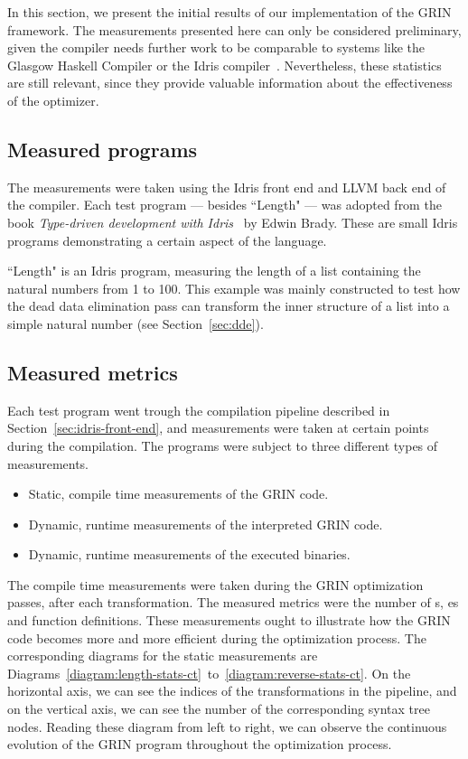 \documentclass[main.tex]{subfiles}
\begin{document}
	
	In this section, we present the initial results of our implementation of the GRIN framework. The measurements presented here can only be considered preliminary, given the compiler needs further work to be comparable to systems like the Glasgow Haskell Compiler or the Idris compiler~\cite{idris}. Nevertheless, these statistics are still relevant, since they provide valuable information about the effectiveness of the optimizer.
	
	\subsection{Measured programs}
	
	The measurements were taken using the Idris front end and LLVM back end of the compiler. Each test program --- besides ``Length" --- was adopted from the book \textit{Type-driven development with Idris}~\cite{tdd-idris} by Edwin Brady. These are small Idris programs demonstrating a certain aspect of the language.
	
	``Length" is an Idris program, measuring the length of a list containing the natural numbers from 1 to 100. This example was mainly constructed to test how the dead data elimination pass can transform the inner structure of a list into a simple natural number (see Section~\ref{sec:dde}).
	
	\subsection{Measured metrics}
	
	Each test program went trough the compilation pipeline described in Section~\ref{sec:idris-front-end}, and measurements were taken at certain points during the compilation. The programs were subject to three different types of measurements.
	
	\vspace{0.25cm}
	\begin{itemize}
		\item Static, compile time measurements of the GRIN code.
		\item Dynamic, runtime measurements of the interpreted GRIN code.
		\item Dynamic, runtime measurements of the executed binaries.
	\end{itemize}
	\vspace{0.25cm}

	The compile time measurements were taken during the GRIN optimization passes, after each transformation. The measured metrics were the number of s, es and function definitions. These measurements ought to illustrate how the GRIN code becomes more and more efficient during the optimization process. The corresponding diagrams for the static measurements are Diagrams~\ref{diagram:length-stats-ct}~to~\ref{diagram:reverse-stats-ct}. On the horizontal axis, we can see the indices of the transformations in the pipeline, and on the vertical axis, we can see the number of the corresponding syntax tree nodes. Reading these diagram from left to right, we can observe the continuous evolution of the GRIN program throughout the optimization process.
	
\end{document}
